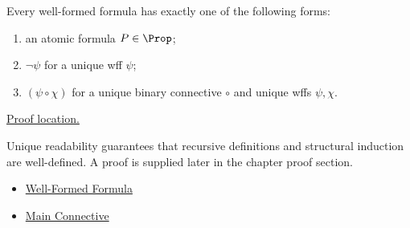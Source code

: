 \begin{tcolorbox}[colback=thmbox, colframe=thmborder, arc=2pt,
  left=6pt, right=6pt, top=4pt, bottom=4pt,
  title={\small\textbf{Theorem (Unique Readability for Propositional Logic)}},
  fonttitle=\small\bfseries]
\label{thm:unique-readability-propositional-logic}
Every well-formed formula has exactly one of the following forms:
\begin{enumerate}
  \item an atomic formula $P\in\Prop$;
  \item $\neg\psi$ for a unique wff $\psi$;
  \item $(\psi\circ\chi)$ for a unique binary connective $\circ$ and unique
        wffs $\psi,\chi$.
\end{enumerate}

\noindent\hyperref[prf:unique-readability-propositional-logic]{Proof location.}
\end{tcolorbox}

\begin{remark*}[Interpretation]
Unique readability guarantees that recursive definitions and structural
induction are well-defined. A proof is supplied later in the chapter proof
section.
\end{remark*}

\begin{dependencies}
\begin{itemize}
  \item \hyperref[def:well-formed-formula]{Well-Formed Formula}
  \item \hyperref[def:main-connective]{Main Connective}
\end{itemize}
\end{dependencies}
